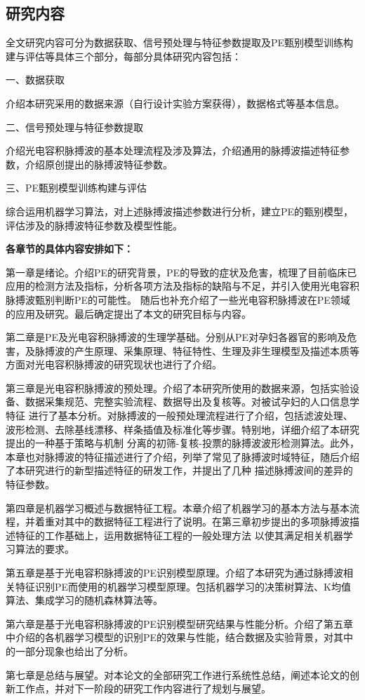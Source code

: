 \subsection{研究内容}
全文研究内容可分为数据获取、信号预处理与特征参数提取及PE甄别模型训练构建与评估等具体三个部分，每部分具体研究内容包括：

一、数据获取

介绍本研究采用的数据来源（自行设计实验方案获得），数据格式等基本信息。

二、信号预处理与特征参数提取

介绍光电容积脉搏波的基本处理流程及涉及算法，介绍通用的脉搏波描述特征参数，介绍原创提出的脉搏波特征参数。

三、PE甄别模型训练构建与评估

综合运用机器学习算法，对上述脉搏波描述参数进行分析，建立PE的甄别模型，评估涉及的脉搏波特征参数及模型性能。

\textbf{各章节的具体内容安排如下：}

第一章是绪论。介绍PE的研究背景，PE的导致的症状及危害，梳理了目前临床已应用的检测方法及指标，分析各项方法及指标的缺陷与不足，并引入使用光电容积脉搏波甄别判断PE的可能性。
随后也补充介绍了一些光电容积脉搏波在PE领域的应用及研究。最后确定提出了本文的研究目标与内容。

第二章是PE及光电容积脉搏波的生理学基础。分别从PE对孕妇各器官的影响及危害，及脉搏波的产生原理、采集原理、特征特性、生理及非生理模型及描述本质等方面对光电容积脉搏波的研究现状也进行了介绍。

第三章是光电容积脉搏波的预处理。介绍了本研究所使用的数据来源，包括实验设备、数据采集规范、完整实验流程、数据导出及复核等。对被试孕妇的人口信息学特征
进行了基本分析。对脉搏波的一般预处理流程进行了介绍，包括滤波处理、波形检测、去除基线漂移、样条插值及标准化等步骤。特别地，详细介绍了本研究提出的一种基于策略与机制
分离的初筛-复核-投票的脉搏波波形检测算法。此外，本章也对脉搏波的特征描述进行了介绍，列举了常见了脉搏波时域特征，随后介绍了本研究进行的新型描述特征的研发工作，并提出了几种
描述脉搏波间的差异的特征参数。

第四章是机器学习概述与数据特征工程。本章介绍了机器学习的基本方法与基本流程，并着重对其中的数据特征工程进行了说明。在第三章初步提出的多项脉搏波描述特征的工作基础上，运用数据特征工程的一般处理方法
以使其满足相关机器学习算法的要求。

第五章是基于光电容积脉搏波的PE识别模型原理。介绍了本研究为通过脉搏波相关特征识别PE而使用的机器学习模型原理。包括机器学习的决策树算法、K均值算法、集成学习的随机森林算法等。

第六章是基于光电容积脉搏波的PE识别模型研究结果与性能分析。介绍了第五章中介绍的各机器学习模型的识别PE的效果与性能，结合数据及实验背景，对其中的一部分现象也给出了分析。

第七章是总结与展望。对本论文的全部研究工作进行系统性总结，阐述本论文的创新工作点，并对下一阶段的研究工作内容进行了规划与展望。